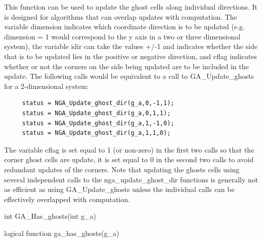 \documentclass[10pt]{article}
\begin{document}
\begin{desc}

This function can be used to update the ghost cells along individual
directions. It is designed for algorithms that can overlap updates with
computation. The variable dimension indicates which coordinate direction is to
be updated (e.g. dimension = 1 would correspond to the y axis in a two or three
dimensional system), the variable idir can take the values +/-1 and indicates
whether the side that is to be updated lies in the positive or negative
direction, and cflag indicates whether or not the corners on the side being
updated are to be included in the update. The following calls would be
equivalent to a call to GA_Update_ghosts for a 2-dimensional system:

\begin{verbatim}
     status = NGA_Update_ghost_dir(g_a,0,-1,1);
     status = NGA_Update_ghost_dir(g_a,0,1,1);
     status = NGA_Update_ghost_dir(g_a,1,-1,0);
     status = NGA_Update_ghost_dir(g_a,1,1,0);
\end{verbatim}

The variable cflag is set equal to 1 (or non-zero) in the first two calls so
that the corner ghost cells are update, it is set equal to 0 in the second two
calls to avoid redundant updates of the corners. Note that updating the ghosts
cells using several independent calls to the nga_update_ghost_dir functions is
generally not as efficient as using GA_Update_ghosts unless the individual
calls can be effectively overlapped with computation.

\end{desc}


\begin{capi}
\begin{ccode}
int GA_Has_ghosts(int g_a)
\end{ccode}
\begin{funcargs}
\end{funcargs}
\end{capi}

\begin{fapi}
\begin{fcode}
logical function ga_has_ghosts(g_a)
\end{fcode}
\begin{funcargs}
\end{funcargs}
\end{fapi}
\end{document}
